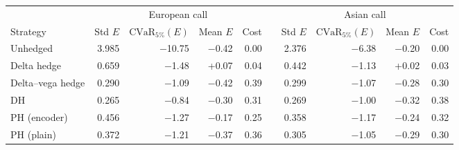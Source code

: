 \begin{tabular}{@{}l rrrr c rrrr@{}}
\toprule
 & \multicolumn{4}{c}{European call} && \multicolumn{4}{c}{Asian call} \\
\cmidrule{2-5}\cmidrule{7-10}
Strategy & Std $E$ & $\mathrm{CVaR}_{5\%}(E)$ & Mean $E$ & Cost && Std $E$ & $\mathrm{CVaR}_{5\%}(E)$ & Mean $E$ & Cost \\
\midrule
Unhedged & 3.985 & $-$10.75 & $-$0.42 & 0.00 && 2.376 & $-$6.38 & $-$0.20 & 0.00 \\
Delta hedge & 0.659 & $-$1.48 & +0.07 & 0.04 && 0.442 & $-$1.13 & +0.02 & 0.03 \\
Delta--vega hedge & 0.290 & $-$1.09 & $-$0.42 & 0.39 && 0.299 & $-$1.07 & $-$0.28 & 0.30 \\
\midrule
DH & 0.265 & $-$0.84 & $-$0.30 & 0.31 && 0.269 & $-$1.00 & $-$0.32 & 0.38 \\
PH (encoder) & 0.456 & $-$1.27 & $-$0.17 & 0.25 && 0.358 & $-$1.17 & $-$0.24 & 0.32 \\
PH (plain) & 0.372 & $-$1.21 & $-$0.37 & 0.36 && 0.305 & $-$1.05 & $-$0.29 & 0.30 \\
\bottomrule
\end{tabular}
